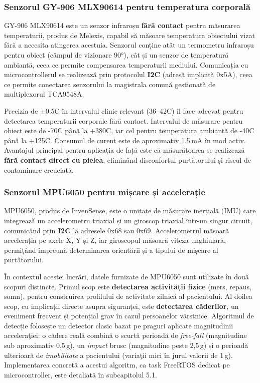﻿\documentclass[12pt,a4paper,twoside]{article}
\begin{document}
\subsubsection{Senzorul GY-906 MLX90614 pentru temperatura corporală}

GY-906 MLX90614 este un senzor infraroșu \textbf{fără contact} pentru măsurarea temperaturii, produs de Melexis, capabil să măsoare temperatura obiectului vizat fără a necesita atingerea acestuia. Senzorul conține atât un termometru infraroșu pentru obiect (câmpul de vizionare 90°), cât și un senzor de temperatură ambiantă, ceea ce permite compensarea temperaturii mediului. Comunicația cu microcontrollerul se realizează prin protocolul \textbf{I2C} (adresă implicită 0x5A), ceea ce permite conectarea senzorului la magistrala comună gestionată de multiplexorul TCA9548A.

Precizia de $\pm$0.5\textdegree C în intervalul clinic relevant (36--42\textdegree C) îl face adecvat pentru detectarea temperaturii corporale fără contact. Intervalul de măsurare pentru obiect este de -70\textdegree C până la +380\textdegree C, iar cel pentru temperatura ambiantă de -40\textdegree C până la +125\textdegree C. Consumul de curent este de aproximativ 1.5\,mA în mod activ. Avantajul principal pentru aplicația de față este că măsurătoarea se realizează \textbf{fără contact direct cu pielea}, eliminând disconfortul purtătorului și riscul de contaminare creuciată.

\subsubsection{Senzorul MPU6050 pentru mișcare și accelerație}

MPU6050, produs de InvenSense, este o unitate de măsurare inerțială (IMU) care integrează un accelerometru triaxial și un giroscop triaxial într-un singur circuit, comunicând prin \textbf{I2C} la adresele 0x68 sau 0x69. Accelerometrul măsoară accelerația pe axele X, Y și Z, iar giroscopul măsoară viteza unghiulară, permițând împreună determinarea orientării și a tipului de mișcare al purtătorului.

În contextul acestei lucrări, datele furnizate de MPU6050 sunt utilizate în două scopuri distincte. Primul scop este \textbf{detectarea activității fizice} (mers, repaus, somn), pentru construirea profilului de activitate zilnică al pacientului. Al doilea scop, cu implicații directe asupra siguranței, este \textbf{detectarea căderilor}, un eveniment frecvent și potențial grav în cazul persoanelor vârstnice. Algoritmul de detecție folosește un detector clasic bazat pe praguri aplicate magnitudinii acceleraţiei: o cădere reală combină o scurtă perioadă de \textit{free-fall} (magnitudine sub aproximativ 0,5\,g), un \textit{impact} brusc (magnitudine peste 2,5\,g) și o perioadă ulterioară de \textit{imobilitate} a pacientului (variaţii mici în jurul valorii de 1\,g). Implementarea concretă a acestui algoritm, ca task FreeRTOS dedicat pe microcontroller, este detaliată în subcapitolul 5.1.
\end{document}
